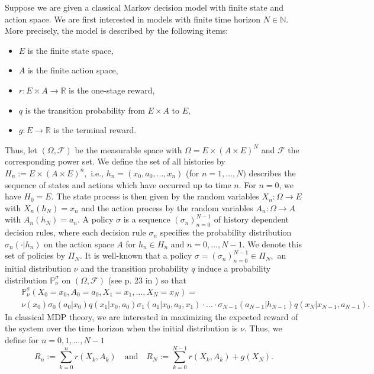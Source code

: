 \documentclass[reqno, 12pt]{amsart}%
\newcommand{\R}{\mathbb{R}} %
\newcommand{\N}{\mathbb{N}} %
\newcommand{\PP}{\mathbb{P}}
\theoremstyle{definition}
\numberwithin{equation}{section} \numberwithin{theorem}{section}
\begin{document}
Suppose we are given a classical Markov decision model with finite state and action space. We are first interested in models with finite time horizon $N\in\N.$ More precisely, the model is described by the following items:
\begin{itemize}
\item[(i)] $E$  is the finite state space,
\item[(ii)] $A$
 is the finite action space,
 \item[(iii)] $r:E\times A \to \R$ is the  one-stage reward,
 \item[(iv)] $q$ is the transition probability from $E\times A$ to $E,$
 \item[(v)] $g:E\to\R$ is the terminal reward.
\end{itemize}
 Thus,
let $(\Omega, \mathcal{F})$   be the measurable space with 
$\Omega= E\times (A\times  E)^N$ and 
	$\mathcal{F}$ the corresponding power set. We define the set of all histories by
 $H_n:= E\times (A\times E)^n,$ i.e., $h_n=(x_0,a_0,\ldots ,x_n)$ (for $n=1,\ldots,N)$ describes the sequence of states and actions which have occurred up to time $n.$
 For $n=0$, we have $H_0=E$. The state process is then given by the random variables $X_n:\Omega \to E$ with $X_n(h_N)=x_n$ and the action process  by the random variables $A_n:\Omega \to A$ with $A_n(h_N)=a_n.$    A policy $\sigma$ is a sequence
 $(\sigma_n)_{n=0}^{N-1}$ of history dependent decision rules, where each decision rule  $\sigma_n $ specifies the probability distribution $\sigma_n(\cdot| h_n)$ on the action space $A$ for
 $h_n \in H_n$ and $n=0,\ldots, N-1.$
We denote this set of policies by $\Pi_N.$  
It is well-known that  a  policy 
$\sigma=(\sigma_n)_{n=0}^{N-1}\in \Pi_N,$ an  initial distribution $\nu$ and the transition probability $q$ induce a  probability distribution $\PP_\nu^\sigma$ on $(\Omega,\mathcal{ F})$ 
(see p. 23 in \cite{puterman2014markov}) so that 
 \begin{eqnarray*}
 && \PP_\nu^\sigma(X_0 =x_0, A_0=a_0, X_1=x_1,\ldots ,X_N=x_N)=\\
  & & \nu(x_0) \sigma_0(a_0|x_0) q(x_1|x_0,a_0) \sigma_1(a_1|x_0,a_0,x_1) \cdot\ldots \cdot \sigma_{N-1}(a_{N-1}|h_{N-1}) q(x_{N}|x_{N-1},a_{N-1}).
    \end{eqnarray*}
In classical MDP theory, we are interested in maximizing the expected reward of the system over the time horizon when the initial distribution is $\nu$. Thus, we define  for $n=0,1,\ldots ,N-1$ 
$$ R_n := \sum_{k=0}^n r(X_k,A_k) \quad \mbox{and} \quad R_N := \sum_{k=0}^{N-1} r(X_k,A_k)+g(X_N).$$
\end{document}
